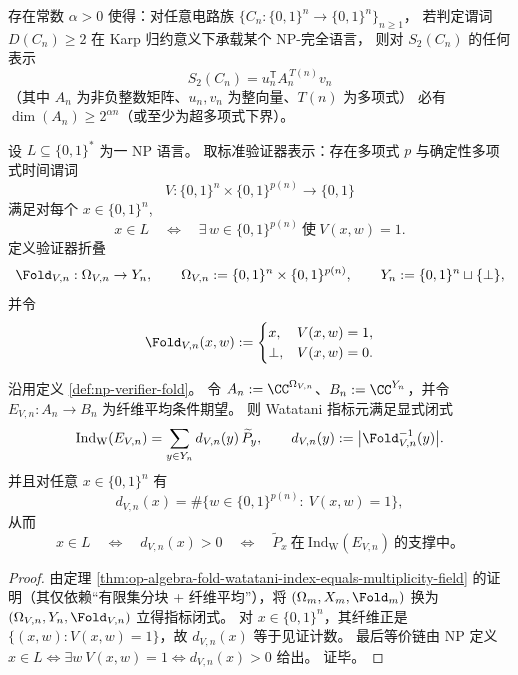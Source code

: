 \begin{conjecture}[NP 完全性强迫碰撞核维数超多项式增长]\label{conj:collision-kernel-dimension-obstruction-np}
存在常数 \(\alpha>0\) 使得：对任意电路族 \(\{C_n:\{0,1\}^n\to\{0,1\}^n\}_{n\ge 1}\)，
若判定谓词 \(D(C_n)\ge 2\) 在 Karp 归约意义下承载某个 \(\mathrm{NP}\)-完全语言，
则对 \(S_2(C_n)\) 的任何表示
\[
S_2(C_n)=u_n^{\mathsf T}A_n^{\,T(n)}v_n
\]
（其中 \(A_n\) 为非负整数矩阵、\(u_n,v_n\) 为整向量、\(T(n)\) 为多项式）
必有 \(\dim(A_n)\ge 2^{\alpha n}\)（或至少为超多项式下界）。
\end{conjecture}

\begin{definition}[NP 验证器折叠]\label{def:np-verifier-fold}
设 \(L\subseteq\{0,1\}^\ast\) 为一 NP 语言。
取标准验证器表示：存在多项式 \(p\) 与确定性多项式时间谓词
\[
V:\{0,1\}^n\times \{0,1\}^{p(n)}\to\{0,1\}
\]
满足对每个 \(x\in\{0,1\}^n\),
\[
x\in L\quad\Longleftrightarrow\quad \exists\,w\in\{0,1\}^{p(n)}\ \text{使}\ V(x,w)=1.
\]
定义验证器折叠
\[
\Fold_{V,n}:\Omega_{V,n}\to Y_n,
\qquad
\Omega_{V,n}:=\{0,1\}^n\times\{0,1\}^{p(n)},
\qquad
Y_n:=\{0,1\}^n\sqcup\{\bot\},
\]
并令
\[
\Fold_{V,n}(x,w):=
\begin{cases}
x, & V(x,w)=1,\\
\bot, & V(x,w)=0.
\end{cases}
\]
\end{definition}

\begin{theorem}\label{thm:np-watatani-index-support-characterization}
沿用定义 \ref{def:np-verifier-fold}。
令 \(A_n:=\CC^{\Omega_{V,n}}\)、\(B_n:=\CC^{Y_n}\)，并令 \(E_{V,n}:A_n\to B_n\) 为纤维平均条件期望。
则 Watatani 指标元满足显式闭式
\[
\mathrm{Ind}_{\mathrm W}(E_{V,n})
=\sum_{y\in Y_n} d_{V,n}(y)\,\widetilde P_y,
\qquad
d_{V,n}(y):=\bigl|\Fold_{V,n}^{-1}(y)\bigr|.
\]
并且对任意 \(x\in\{0,1\}^n\) 有
\[
d_{V,n}(x)=\#\{w\in\{0,1\}^{p(n)}:\ V(x,w)=1\},
\]
从而
\[
x\in L
\quad\Longleftrightarrow\quad
d_{V,n}(x)>0
\quad\Longleftrightarrow\quad
\widetilde P_x\ \text{在}\ \mathrm{Ind}_{\mathrm W}(E_{V,n})\ \text{的支撑中。}
\]
\end{theorem}
\begin{proof}
由定理 \ref{thm:op-algebra-fold-watatani-index-equals-multiplicity-field} 的证明（其仅依赖“有限集分块 + 纤维平均”），将 \((\Omega_m,X_m,\Fold_m)\) 换为 \((\Omega_{V,n},Y_n,\Fold_{V,n})\) 立得指标闭式。
对 \(x\in\{0,1\}^n\)，其纤维正是 \(\{(x,w):V(x,w)=1\}\)，故 \(d_{V,n}(x)\) 等于见证计数。
最后等价链由 NP 定义 \(x\in L\iff \exists w\ V(x,w)=1\iff d_{V,n}(x)>0\) 给出。
证毕。
\end{proof}

